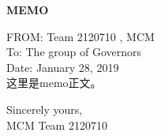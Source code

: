 \documentclass[13pt]{ctexart} %
\begin{document}
\newpage
\setmainfont{texgyrepagella-regular.otf}
\thispagestyle{empty}
{\centering \fontsize{18pt}{14pt}\selectfont \textbf{MEMO}\par}

\noindent FROM: Team {} 2120710 , MCM\\
\noindent To: The group of Governors\\
\noindent Date: January 28, 2019
\vspace{10pt}
\\
这里是memo正文。

\thispagestyle{empty}
{\raggedleft
    Sincerely yours,\\
    MCM Team 2120710\par
}

\newpage
\thispagestyle{empty}
\tableofcontents
\newpage
\setcounter{page}{1}
\end{document}
